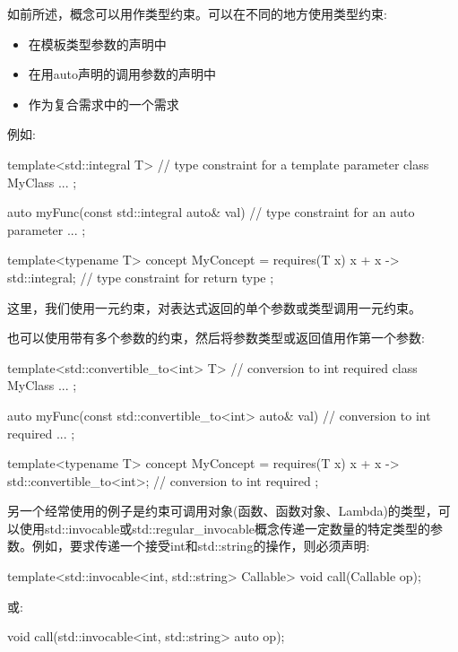 如前所述，概念可以用作类型约束。可以在不同的地方使用类型约束:

\begin{itemize}
\item
在模板类型参数的声明中

\item
在用auto声明的调用参数的声明中

\item
作为复合需求中的一个需求
\end{itemize}

例如:

\begin{cpp}
template<std::integral T> // type constraint for a template parameter
class MyClass {
	...
};

auto myFunc(const std::integral auto& val) { // type constraint for an auto parameter
	...
};

template<typename T>
concept MyConcept = requires(T x) {
		{ x + x } -> std::integral; // type constraint for return type
	};
\end{cpp}

这里，我们使用一元约束，对表达式返回的单个参数或类型调用一元约束。


也可以使用带有多个参数的约束，然后将参数类型或返回值用作第一个参数:

\begin{cpp}
template<std::convertible_to<int> T> // conversion to int required
class MyClass {
	...
};

auto myFunc(const std::convertible_to<int> auto& val) { // conversion to int required
	...
};

template<typename T>
concept MyConcept = requires(T x) {
		{ x + x } -> std::convertible_to<int>; // conversion to int required
	};
\end{cpp}

另一个经常使用的例子是约束可调用对象(函数、函数对象、Lambda)的类型，可以使用std::invocable或std::regular\_invocable概念传递一定数量的特定类型的参数。例如，要求传递一个接受int和std::string的操作，则必须声明:

\begin{cpp}
template<std::invocable<int, std::string> Callable>
void call(Callable op);
\end{cpp}

或:

\begin{cpp}
void call(std::invocable<int, std::string> auto op);
\end{cpp}

